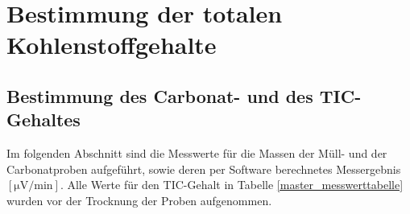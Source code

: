 
\newpage

\section{Bestimmung der totalen Kohlenstoffgehalte}
\subsection{Bestimmung des Carbonat- und des TIC-Gehaltes}
\label{sec:tic}

Im folgenden Abschnitt sind die Messwerte für die Massen %
der Müll- und der Carbonatproben aufgeführt, sowie deren per Software berechnetes Messergebnis $\left[\si{\micro \volt \per \minute}\right]$. Alle Werte für den TIC-Gehalt in Tabelle \ref{master_messwerttabelle} wurden vor der Trocknung der Proben aufgenommen.

\vspace*{-5mm}
